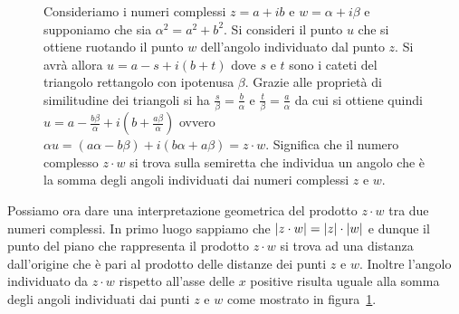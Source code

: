 \begin{figure}
  \begin{center}
  \end{center}
  \caption{Consideriamo i numeri complessi $z=a+ib$ e $w=\alpha+i\beta$
  e supponiamo che sia $\alpha^2 = a^2+b^2$.
  Si consideri il punto $u$ che si ottiene ruotando il punto $w$ dell'angolo
  individuato dal punto $z$. Si avrà allora $u=a-s + i(b+t)$ dove $s$ e $t$
  sono i cateti del triangolo rettangolo con ipotenusa $\beta$.
  Grazie alle proprietà di similitudine dei triangoli si ha
  $\frac{s}{\beta} = \frac{b}{\alpha}$ e $\frac{t}{\beta} = \frac{a}{\alpha}$
  da cui si ottiene quindi $u = a-\frac{b\beta}{\alpha}+i(b+\frac{a\beta}{\alpha})$
  ovvero $\alpha u = (a\alpha - b \beta) + i (b\alpha + a \beta) = z\cdot w$.
  Significa che il numero complesso $z\cdot w$ si trova sulla semiretta
  che individua un angolo che è la somma degli angoli individuati
  dai numeri complessi $z$ e $w$.
  }
  \label{fig:prodotto_complesso}
\end{figure}

Possiamo ora dare una interpretazione geometrica del prodotto $z\cdot w$
tra due numeri complessi. In primo luogo sappiamo che ${\left|z\cdot w\right|} = {\left|z\right|} \cdot {\left|w\right|}$ e dunque il punto del piano che rappresenta il prodotto $z\cdot w$ si trova ad una distanza dall'origine che è pari al prodotto delle distanze
dei punti $z$ e $w$. Inoltre l'angolo individuato da $z\cdot w$ rispetto
all'asse delle $x$ positive risulta uguale alla somma
degli angoli individuati dai punti $z$ e $w$ come mostrato in figura~\ref{fig:prodotto_complesso}.

